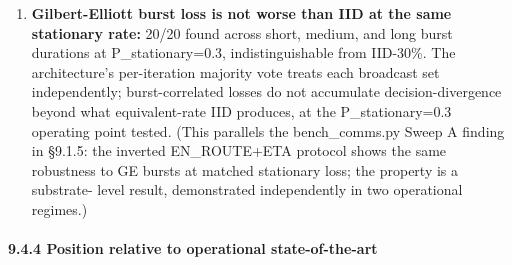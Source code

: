 \begin{enumerate}
  boundary would require larger N (e.g., 40 or 100 drones) where the
  integer-quantization cliff becomes informative rather than
  tautological. We report this as confirmation that the composition's
  failure mode under asymmetric loss is the failure mode predicted by
  voting protocol theory applied at the architectural seam.
\item
  \textbf{Gilbert-Elliott burst loss is not worse than IID at the same
  stationary rate:} 20/20 found across short, medium, and long burst
  durations at P\_stationary=0.3, indistinguishable from IID-30\%. The
  architecture's per-iteration majority vote treats each broadcast set
  independently; burst-correlated losses do not accumulate
  decision-divergence beyond what equivalent-rate IID produces, at the
  P\_stationary=0.3 operating point tested. (This parallels the
  bench\_comms.py Sweep A finding in §9.1.5: the inverted EN\_ROUTE+ETA
  protocol shows the same robustness to GE bursts at matched stationary
  loss; the property is a substrate- level result, demonstrated
  independently in two operational regimes.)
\end{enumerate}

\paragraph{9.4.4 Position relative to operational
state-of-the-art}\label{position-relative-to-operational-state-of-the-art}

